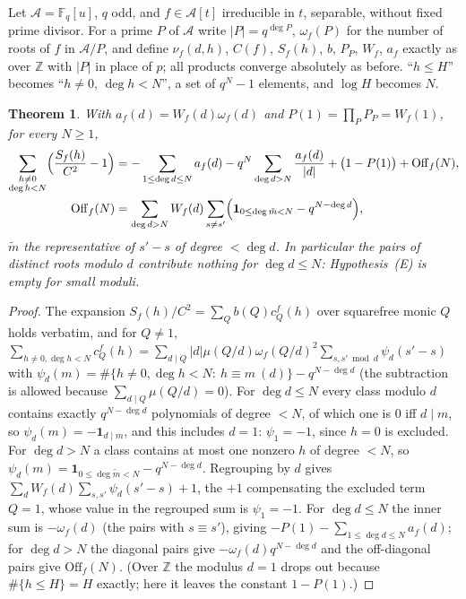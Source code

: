 \documentclass[11pt,a4paper]{article}
\newtheorem{theorem}{Theorem}
\newcommand{\Z}{\mathbb{Z}}
\newcommand{\F}{\mathbb{F}}
\newcommand{\A}{\mathcal A}
\begin{document}
Let $\A=\F_q[u]$, $q$ odd, and $f\in\A[t]$ irreducible in $t$, separable, without fixed prime divisor.
For a prime $P$ of $\A$ write $|P|=q^{\deg P}$, $\omega_f(P)$ for the number of roots of $f$ in $\A/P$,
and define $\nu_f(d,h)$, $C(f)$, $S_f(h)$, $b$, $P_P$, $W_f$, $a_f$ exactly as over $\Z$ with $|P|$ in place
of $p$; all products converge absolutely as before. ``$h\le H$'' becomes ``$h\ne0$, $\deg h<N$'', a set of
$q^N-1$ elements, and $\log H$ becomes $N$.

\begin{theorem}\label{thm:B1}
With $a_f(d)=W_f(d)\omega_f(d)$ and $P(1)=\prod_PP_P=W_f(1)$, for every $N\ge1$,
\begin{align*}
\sum_{\substack{h\ne0\\\deg h<N}}\Bigl(\frac{S_f(h)}{C^2}-1\Bigr)
&=-\sum_{1\le\deg d\le N}a_f(d)-q^N\sum_{\deg d>N}\frac{a_f(d)}{|d|}+\bigl(1-P(1)\bigr)+\mathrm{Off}_f(N),\\
\mathrm{Off}_f(N)&=\sum_{\deg d>N}W_f(d)\sum_{s\ne s'}\Bigl(\mathbf 1_{0\le\deg\tilde m<N}-q^{N-\deg d}\Bigr),
\end{align*}
$\tilde m$ the representative of $s'-s$ of degree $<\deg d$. In particular the pairs of \emph{distinct}
roots modulo $d$ contribute nothing for $\deg d\le N$: Hypothesis~(E) is empty for small moduli.
\end{theorem}

\begin{proof}
The expansion $S_f(h)/C^2=\sum_Qb(Q)c^f_Q(h)$ over squarefree monic $Q$ holds verbatim, and for $Q\ne1$,
$\sum_{h\ne0,\deg h<N}c^f_Q(h)=\sum_{d\mid Q}|d|\mu(Q/d)\omega_f(Q/d)^2\sum_{s,s'\bmod d}\psi_d(s'-s)$ with
$\psi_d(m)=\#\{h\ne0,\deg h<N:\ h\equiv m\ (d)\}-q^{N-\deg d}$ (the subtraction is allowed because
$\sum_{d\mid Q}\mu(Q/d)=0$). For $\deg d\le N$ every class modulo $d$ contains exactly $q^{N-\deg d}$
polynomials of degree $<N$, of which one is $0$ iff $d\mid m$, so $\psi_d(m)=-\mathbf 1_{d\mid m}$, and this
includes $d=1$: $\psi_1=-1$, since $h=0$ is excluded. For $\deg d>N$ a class contains at most one nonzero
$h$ of degree $<N$, so $\psi_d(m)=\mathbf 1_{0\le\deg\tilde m<N}-q^{N-\deg d}$. Regrouping by $d$ gives
$\sum_dW_f(d)\sum_{s,s'}\psi_d(s'-s)+1$, the $+1$ compensating the excluded term $Q=1$, whose value in the
regrouped sum is $\psi_1=-1$. For $\deg d\le N$ the inner sum is $-\omega_f(d)$ (the pairs with
$s\equiv s'$), giving $-P(1)-\sum_{1\le\deg d\le N}a_f(d)$; for $\deg d>N$ the diagonal pairs give
$-\omega_f(d)q^{N-\deg d}$ and the off-diagonal pairs give $\mathrm{Off}_f(N)$. (Over $\Z$ the modulus
$d=1$ drops out because $\#\{h\le H\}=H$ exactly; here it leaves the constant $1-P(1)$.)
\end{proof}
\end{document}
